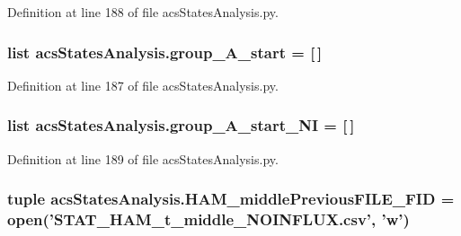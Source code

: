 Definition at line 188 of file acs\-States\-Analysis.\-py.

\hypertarget{a00098_a3898175300d001a17a60c23656d2812f}{
\subsubsection[{group\-\_\-\-A\-\_\-start}]{\setlength{\rightskip}{0pt plus 5cm}list acs\-States\-Analysis.\-group\-\_\-\-A\-\_\-start = \mbox{[}$\,$\mbox{]}}}\label{a00098_a3898175300d001a17a60c23656d2812f}


Definition at line 187 of file acs\-States\-Analysis.\-py.

\hypertarget{a00098_aedb746884c5ae6e301c8ad2d8307fe4d}{
\subsubsection[{group\-\_\-\-A\-\_\-start\-\_\-\-N\-I}]{\setlength{\rightskip}{0pt plus 5cm}list acs\-States\-Analysis.\-group\-\_\-\-A\-\_\-start\-\_\-\-N\-I = \mbox{[}$\,$\mbox{]}}}\label{a00098_aedb746884c5ae6e301c8ad2d8307fe4d}


Definition at line 189 of file acs\-States\-Analysis.\-py.

\hypertarget{a00098_aaf0dd6e74d88a7cf2e909301b422c17d}{
\subsubsection[{H\-A\-M\-\_\-middle\-Previous\-F\-I\-L\-E\-\_\-\-F\-I\-D}]{\setlength{\rightskip}{0pt plus 5cm}tuple acs\-States\-Analysis.\-H\-A\-M\-\_\-middle\-Previous\-F\-I\-L\-E\-\_\-\-F\-I\-D = open('S\-T\-A\-T\-\_\-\-H\-A\-M\-\_\-t\-\_\-middle\-\_\-\-N\-O\-I\-N\-F\-L\-U\-X.\-csv', 'w')}}\label{a00098_aaf0dd6e74d88a7cf2e909301b422c17d}


